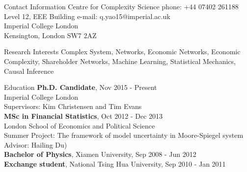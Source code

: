 \documentclass{resume} %
\begin{document}
\begin{rSection}{Contact Information}
Centre for Complexity Science \hfill phone: +44 07402 261188\\
Level 12, EEE Building \hfill e-mail: q.yao15@imperial.ac.uk\\ 
Imperial College London\\
Kensington, London SW7 2AZ

\end{rSection}
\begin{rSection}{Research Interests}
Complex System, Networks, Economic Networks, Economic Complexity, Shareholder Networks, Machine Learning, Statistical Mechanics, Causal Inference
\end{rSection}


\begin{rSection}{Education}
{\bf Ph.D. Candidate}, {Nov 2015 - Present}\\
Imperial College London\\ 
\smallskip\smallskip
Supervisors: Kim Christensen and Tim Evans\\
{\bf MSc in Financial Statistics}, {Oct 2012 - Dec 2013}\\
 London School of Economics and Political Science\\
 Summer Project: The framework of model uncertainty in Moore-Spiegel system \\
 \smallskip\smallskip
 Advisor: Hailing Du)\\
 {\bf Bachelor of Physics}, Xiamen University, Sep 2008 - Jun 2012\\
 {\bf Exchange student}, National Tsing Hua University, Sep 2010 - Jan 2011\\
\end{rSection}
\end{document}
